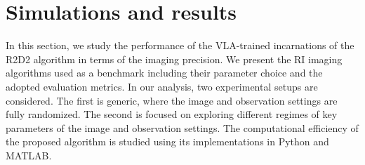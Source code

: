 \documentclass[preprint2,twocolumn]{aastex631}
\begin{document}
\begin{table}
\hspace{-2cm}
\caption {Training computational details of R2D2, R3D3 realizations ($\textrm{R3D3}^{\textrm{3L}}$,~$\textrm{R3D3}^{\textrm{6L}}$), and the end-to-end DNNs corresponding to the first components in their series, U-Net and R2D2-Net ($\textrm{R2D2-Net}^{\textrm{3L}}$, $\textrm{R2D2-Net}^{\textrm{6L}}$), respectively. Results are reported in terms of: the number of iterations~($I$), the number of learnable parameters of their network components~($Q$), the cumulative number of epochs~($n_{\textrm{epochs}}$), the number of CPU cores~($n_{\textrm{cpu}}$) deployed for generating the dirty images and updating the residual dirty images, and the number of GPUs~($n_{\textrm{gpu}}$), deployed for DNN training and updating the image estimates. The training computational cost is provided in GPU~hr and CPU~hr.} 
\label{table:training_cost}
\end{table}

\section{Simulations and results} \label{sec:simulations-results} 
In this section, we study the performance of the VLA-trained incarnations of the R2D2 algorithm in terms of the imaging precision. We present the RI imaging algorithms used as a benchmark including their parameter choice and the adopted evaluation metrics. In our analysis, two experimental setups are considered. The first is generic, where the image and observation settings are fully randomized. The second is focused on exploring different regimes of key parameters of the image and observation settings. The computational efficiency of the proposed algorithm is studied using its implementations in Python and MATLAB.
\end{document}
